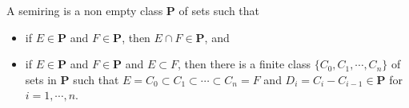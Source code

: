 A semiring is a non empty class $\mathbf{P}$ of sets such that
\begin{itemize}
\item[(a)] if $E \in \mathbf{P}$ and $F \in \mathbf{P}$, then $E \cap F \in \mathbf{P}$, and
\item[(b)] if $E \in \mathbf{P}$ and $F \in \mathbf{P}$ and $E \subset F$, then there is a finite class $\{C_0, C_1, \cdots, C_n\}$ of sets in $\mathbf{P}$ such that $E = C_0 \subset C_1 \subset \cdots \subset C_n = F$ and $D_i = C_i - C_{i-1} \in \mathbf{P}$ for $i = 1, \cdots, n$.
\end{itemize}
